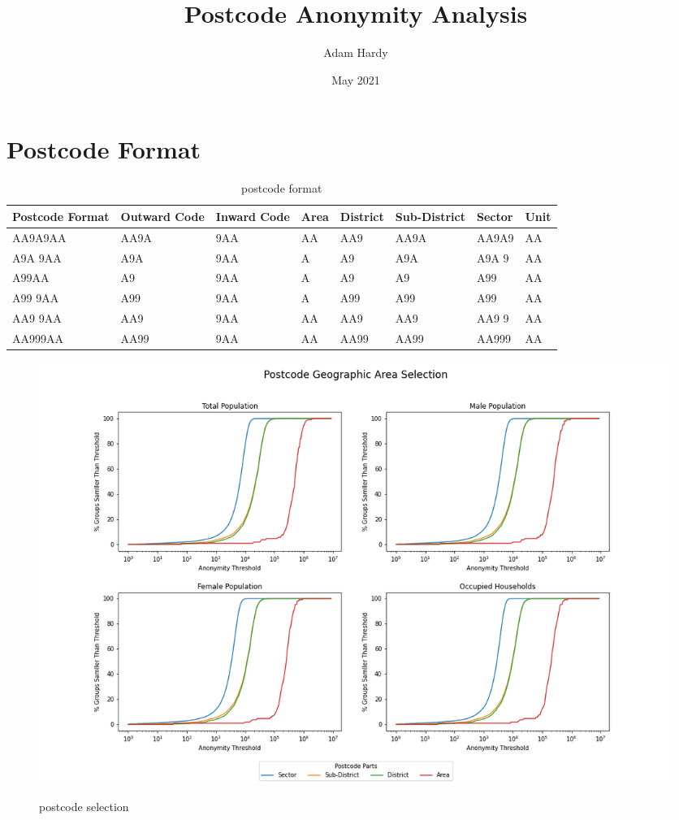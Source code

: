\documentclass[12pt, a4paper]{article}
\title{Postcode Anonymity Analysis}
\author{Adam Hardy}
\date{May 2021}
\begin{document}
\maketitle
\cleardoublepage
{}%

\section{Postcode Format}
\begin{table}
\begin{center}
	\begin{tabular}{ >{\centering\arraybackslash}m{} | >{\centering\arraybackslash}m{} | >{\centering\arraybackslash}m{} | >{\centering\arraybackslash}m{} | >{\centering\arraybackslash}m{} | >{\centering\arraybackslash}m{} | >{\centering\arraybackslash}m{} | >{\centering\arraybackslash}m{}}
		Postcode Format & Outward Code & Inward Code & Area & District & Sub-District & Sector & Unit \\ \hline
		AA9A9AA & AA9A & 9AA & AA & AA9 & AA9A & AA9A9 & AA \\
        A9A 9AA & A9A & 9AA & A & A9 & A9A & A9A 9 & AA \\
        A9\space\space9AA & A9 & 9AA & A & A9 & A9 & A99 & AA \\
        A99 9AA & A99 & 9AA & A & A99 & A99 & A99 & AA \\
        AA9 9AA & AA9 & 9AA & AA & AA9 & AA9 & AA9 9 & AA \\
        AA999AA & AA99 & 9AA  & AA & AA99 & AA99 & AA999 & AA\\
	\end{tabular}
\end{center}
\label{table:postcode_format}
\caption{postcode format}
\end{table}

\begin{figure}
\includegraphics[width=1\textwidth,trim={0.1cm, 0.1cm, 0.1cm, 0.1cm},clip]{images/postode_selection.png}
\label{fig:postcode_selection}
\caption{postcode selection}
\end{figure}
\end{document}
